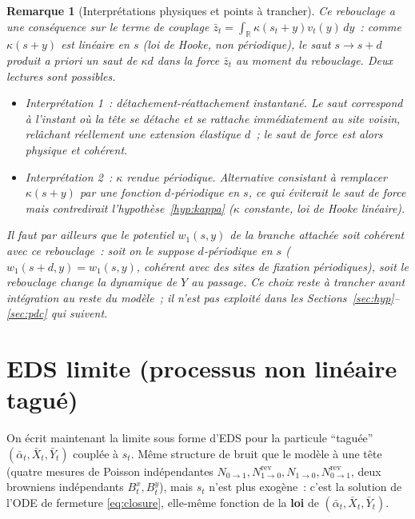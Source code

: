 \documentclass[11pt,a4paper]{article}
\newcommand{\R}{\mathbb{R}}
\theoremstyle{plain}
\newtheorem*{remark*}{Remarque}
\theoremstyle{definition}
\begin{document}
\begin{remark*}[Interpr\'etations physiques et points \`a trancher]
Ce rebouclage a une cons\'equence sur le terme de couplage $\bar z_t=\int_\R\kappa(s_t+y)v_t(y)\,dy$~: comme $\kappa(s+y)$ est \emph{lin\'eaire} en $s$ (loi de Hooke, non p\'eriodique), le saut $s\to s+d$ produit \emph{a priori} un saut de $\kappa d$ dans la force $\bar z_t$ au moment du rebouclage. Deux lectures sont possibles.
\begin{itemize}
\item \emph{Interpr\'etation 1~: d\'etachement-r\'eattachement instantan\'e.} Le saut correspond \`a l'instant o\`u la t\^ete se d\'etache et se rattache imm\'ediatement au site voisin, rel\^achant r\'eellement une extension \'elastique $d$~; le saut de force est alors physique et coh\'erent.
\item \emph{Interpr\'etation 2~: $\kappa$ rendue p\'eriodique.} Alternative consistant \`a remplacer $\kappa(s+y)$ par une fonction $d$-p\'eriodique en $s$, ce qui \'eviterait le saut de force mais contredirait l'hypoth\`ese~\ref{hyp:kappa} ($\kappa$ constante, loi de Hooke lin\'eaire).
\end{itemize}
Il faut par ailleurs que le potentiel $w_1(s,y)$ de la branche attach\'ee soit coh\'erent avec ce rebouclage~: soit on le suppose $d$-p\'eriodique en $s$ ($w_1(s+d,y)=w_1(s,y)$, coh\'erent avec des sites de fixation p\'eriodiques), soit le rebouclage change la dynamique de $Y$ au passage. Ce choix reste \`a trancher avant int\'egration au reste du mod\`ele~; il n'est pas exploit\'e dans les Sections~\ref{sec:hyp}--\ref{sec:pdc} qui suivent.
\end{remark*}

\section{EDS limite (processus non lin\'eaire tagu\'e)}
\label{sec:eds}

On \'ecrit maintenant la limite sous forme d'EDS pour la particule ``tagu\'ee'' $(\bar\alpha_t,\bar X_t,\bar Y_t)$ coupl\'ee \`a $s_t$. M\^eme structure de bruit que le mod\`ele \`a une t\^ete (quatre mesures de Poisson ind\'ependantes $N_{0\to1}, N^{\mathrm{rev}}_{1\to0}, N_{1\to0}, N^{\mathrm{rev}}_{0\to1}$, deux browniens ind\'ependants $B^x_t,B^y_t$), mais $s_t$ n'est plus exog\`ene~: c'est la solution de l'ODE de fermeture \eqref{eq:closure}, elle-m\^eme fonction de la \textbf{loi} de $(\bar\alpha_t,\bar X_t,\bar Y_t)$.
\end{document}

